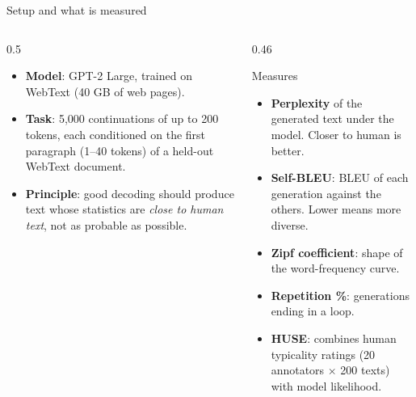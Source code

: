 \documentclass[aspectratio=169,11pt]{beamer}
\begin{document}
\begin{frame}{Setup and what is measured}
  \begin{columns}[T]
    \begin{column}{0.5\textwidth}
      \small
      \begin{itemize}
        \item \textbf{Model}: GPT-2 Large, trained on WebText (40 GB of web pages).
        \item \textbf{Task}: 5,000 continuations of up to 200 tokens, each conditioned on the first paragraph (1--40 tokens) of a held-out WebText document.
        \item \textbf{Principle}: good decoding should produce text whose statistics are \emph{close to human text}, not as probable as possible.
      \end{itemize}
    \end{column}
    \begin{column}{0.46\textwidth}
      \begin{block}{Measures}
        \small
        \begin{itemize}
          \item \textbf{Perplexity} of the generated text under the model. Closer to human is better.
          \item \textbf{Self-BLEU}: BLEU of each generation against the others. Lower means more diverse.
          \item \textbf{Zipf coefficient}: shape of the word-frequency curve.
          \item \textbf{Repetition \%}: generations ending in a loop.
          \item \textbf{HUSE}: combines human typicality ratings (20 annotators $\times$ 200 texts) with model likelihood.
        \end{itemize}
      \end{block}
    \end{column}
  \end{columns}
\end{frame}
\end{document}
